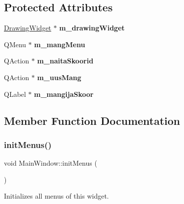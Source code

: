 \subsection*{Protected Attributes}
\begin{DoxyCompactItemize}
\item 
\mbox{\label{class_main_window_ae5114a22191b22c04a9770c51f6e7949}} 
\mbox{\hyperlink{class_drawing_widget}{Drawing\+Widget}} $\ast$ {\bfseries m\+\_\+drawing\+Widget}
\item 
\mbox{\label{class_main_window_ab57e215a270fffb94f2f13bcc77200f1}} 
Q\+Menu $\ast$ {\bfseries m\+\_\+mang\+Menu}
\item 
\mbox{\label{class_main_window_a1be4b451b29bb61a78d2d65c2cae79fc}} 
Q\+Action $\ast$ {\bfseries m\+\_\+naita\+Skoorid}
\item 
\mbox{\label{class_main_window_a89b0cdd8bfce2b8ce9f2561242e94df1}} 
Q\+Action $\ast$ {\bfseries m\+\_\+uus\+Mang}
\item 
\mbox{\label{class_main_window_a576bcc71a76d9dda31ba98cc4155480d}} 
Q\+Label $\ast$ {\bfseries m\+\_\+mangija\+Skoor}
\end{DoxyCompactItemize}


\subsection{Member Function Documentation}
\mbox{\label{class_main_window_ab15809fe98998fe084f11c87936a9935}} 
\subsubsection{\texorpdfstring{initMenus()}{initMenus()}}
{\footnotesize\ttfamily void Main\+Window\+::init\+Menus (\begin{DoxyParamCaption}{ }\end{DoxyParamCaption})\hspace{0.3cm}{\ttfamily [protected]}}

Initializes all menus of this widget. \mbox{\label{class_main_window_afcf77332d90edc94daa4d7283c061a90}} 
